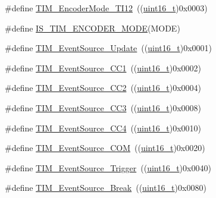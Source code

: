 \begin{DoxyCompactItemize}
\item 
\#define \hyperlink{group___t_i_m___encoder___mode_ga12511f903de08f1a634ff7828757f081}{T\+I\+M\+\_\+\+Encoder\+Mode\+\_\+\+T\+I12}~((\hyperlink{_p_e___types_8h_a1f1825b69244eb3ad2c7165ddc99c956}{uint16\+\_\+t})0x0003)
\item 
\#define \hyperlink{group___t_i_m___encoder___mode_ga9dd5baa6b2a44e0f25068a650cbfdd1b}{I\+S\+\_\+\+T\+I\+M\+\_\+\+E\+N\+C\+O\+D\+E\+R\+\_\+\+M\+O\+DE}(M\+O\+DE)
\item 
\#define \hyperlink{group___t_i_m___event___source_ga5bff72fbe94b1ae5a710e402c9868b23}{T\+I\+M\+\_\+\+Event\+Source\+\_\+\+Update}~((\hyperlink{_p_e___types_8h_a1f1825b69244eb3ad2c7165ddc99c956}{uint16\+\_\+t})0x0001)
\item 
\#define \hyperlink{group___t_i_m___event___source_gaa634c46d4ac521ad16e25be97b487e8a}{T\+I\+M\+\_\+\+Event\+Source\+\_\+\+C\+C1}~((\hyperlink{_p_e___types_8h_a1f1825b69244eb3ad2c7165ddc99c956}{uint16\+\_\+t})0x0002)
\item 
\#define \hyperlink{group___t_i_m___event___source_ga5e2082a09552acc9c7e9577f104ba15a}{T\+I\+M\+\_\+\+Event\+Source\+\_\+\+C\+C2}~((\hyperlink{_p_e___types_8h_a1f1825b69244eb3ad2c7165ddc99c956}{uint16\+\_\+t})0x0004)
\item 
\#define \hyperlink{group___t_i_m___event___source_gafeb8538e3b00d938e061e5051f83836b}{T\+I\+M\+\_\+\+Event\+Source\+\_\+\+C\+C3}~((\hyperlink{_p_e___types_8h_a1f1825b69244eb3ad2c7165ddc99c956}{uint16\+\_\+t})0x0008)
\item 
\#define \hyperlink{group___t_i_m___event___source_gab60e3190e6c09d2d067f2c689d614979}{T\+I\+M\+\_\+\+Event\+Source\+\_\+\+C\+C4}~((\hyperlink{_p_e___types_8h_a1f1825b69244eb3ad2c7165ddc99c956}{uint16\+\_\+t})0x0010)
\item 
\#define \hyperlink{group___t_i_m___event___source_ga4c06981037fae91786f966aa9b4b3435}{T\+I\+M\+\_\+\+Event\+Source\+\_\+\+C\+OM}~((\hyperlink{_p_e___types_8h_a1f1825b69244eb3ad2c7165ddc99c956}{uint16\+\_\+t})0x0020)
\item 
\#define \hyperlink{group___t_i_m___event___source_ga24835bf5eac25eed90069208dce22564}{T\+I\+M\+\_\+\+Event\+Source\+\_\+\+Trigger}~((\hyperlink{_p_e___types_8h_a1f1825b69244eb3ad2c7165ddc99c956}{uint16\+\_\+t})0x0040)
\item 
\#define \hyperlink{group___t_i_m___event___source_gad6f9b5366d93c73ff005273c50c9f00a}{T\+I\+M\+\_\+\+Event\+Source\+\_\+\+Break}~((\hyperlink{_p_e___types_8h_a1f1825b69244eb3ad2c7165ddc99c956}{uint16\+\_\+t})0x0080)
\item 

\end{DoxyCompactItemize}
